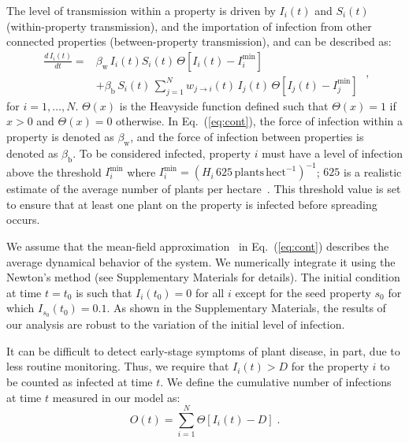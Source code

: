 \documentclass[aps,physrev,reprint,superscriptaddress]{revtex4-1}
\begin{document}
The level of transmission within a property is driven by $I_i(t)$ and $S_i(t)$ (within-property transmission), and the importation of infection from other connected properties (between-property transmission), and can be described as:
\begin{equation}
\begin{array}{ll}
\frac{d \, I_i(t)}{dt} = & \beta_{\mathrm{w}} \, I_i(t) S_{i}(t) \, \Theta \left[I_i(t) - I_i^{\min} \right] 
\\
& +\beta_{\mathrm{b}} \, S_{i}(t) \,  \sum_{j=1}^N w_{j \to i}(t)  \, I_{j}(t) \, \Theta \left[I_j(t) - I_j^{\min} \right] 
\end{array}
\; ,
\label{eq:cont}
\end{equation}
for $i = 1, \ldots, N$. $\Theta(x)$ is the Heavyside function defined such that $\Theta(x) = 1$ if $x > 0$ and 
$\Theta(x) = 0$ otherwise.
In Eq.~(\ref{eq:cont}), the force of infection within a property is denoted as $\beta_\mathrm{w}$, and the force of infection between properties is denoted as $\beta_\mathrm{b}$. 
To be considered infected, property $i$ must have a level of infection above the threshold $I_{i}^{\min}$ where $I_{i}^{\min} = \left(H_i \, 625 \, \mathrm{plants \, hect}^{-1}\right)^{-1}$; $625$ is a realistic estimate of the average number of plants per hectare~\cite{NZKGI2024}.
This threshold value is set to ensure that at least one plant on the property is infected before spreading occurs.



We assume that the mean-field approximation~\cite{RevModPhys.87.925} in Eq.~(\ref{eq:cont}) describes the average dynamical behavior of the system. We numerically integrate it using the Newton's method (see Supplementary Materials for details). The initial condition at time $t = t_0$ is such that $I_i(t_0) = 0$ for all $i$ except for the seed property $s_0$ for which $I_{s_0}(t_0) = 0.1$. As shown in the Supplementary Materials, the results of our analysis are robust to the variation of the initial level of infection.


It can be difficult to detect early-stage symptoms of plant disease, in part,  due to less routine monitoring. Thus, we require that  $I_i(t) > D$ for the property $i$ to be counted as infected at time $t$. We define the cumulative number of infections at time $t$ measured in our model as:
\begin{equation}
    O(t) = \sum_{i=1}^N \Theta \left[ I_{i}(t) - D \right] \; .
    \label{eq:infected}
\end{equation}
\end{document}
